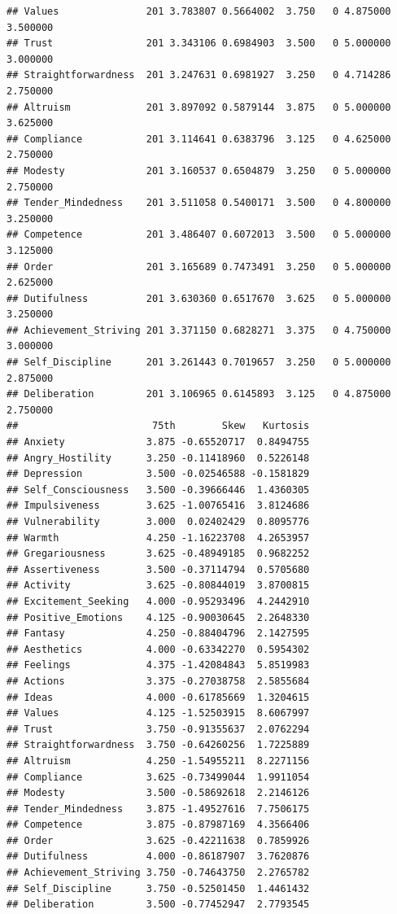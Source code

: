 \documentclass{article}\usepackage[]{graphicx}\usepackage[]{color}
\makeatletter
\newenvironment{kframe}{%
 \def\at@end@of@kframe{}%
 \ifinner\ifhmode%
  \def\at@end@of@kframe{\end{minipage}}%
  \begin{minipage}{\columnwidth}%
 \fi\fi%
 \def\FrameCommand##1{\hskip\@totalleftmargin \hskip-\fboxsep
 \colorbox{shadecolor}{##1}\hskip-\fboxsep
     \hskip-\linewidth \hskip-\@totalleftmargin \hskip\columnwidth}%
 \MakeFramed {\advance\hsize-\width
   \@totalleftmargin\z@ \linewidth\hsize
   \@setminipage}}%
 {\par\unskip\endMakeFramed%
 \at@end@of@kframe}
\newenvironment{knitrout}{}{} %
\makeatother
\begin{document}
\begin{knitrout}
\begin{kframe}
\begin{verbatim}
## Values               201 3.783807 0.5664002  3.750   0 4.875000 3.500000
## Trust                201 3.343106 0.6984903  3.500   0 5.000000 3.000000
## Straightforwardness  201 3.247631 0.6981927  3.250   0 4.714286 2.750000
## Altruism             201 3.897092 0.5879144  3.875   0 5.000000 3.625000
## Compliance           201 3.114641 0.6383796  3.125   0 4.625000 2.750000
## Modesty              201 3.160537 0.6504879  3.250   0 5.000000 2.750000
## Tender_Mindedness    201 3.511058 0.5400171  3.500   0 4.800000 3.250000
## Competence           201 3.486407 0.6072013  3.500   0 5.000000 3.125000
## Order                201 3.165689 0.7473491  3.250   0 5.000000 2.625000
## Dutifulness          201 3.630360 0.6517670  3.625   0 5.000000 3.250000
## Achievement_Striving 201 3.371150 0.6828271  3.375   0 4.750000 3.000000
## Self_Discipline      201 3.261443 0.7019657  3.250   0 5.000000 2.875000
## Deliberation         201 3.106965 0.6145893  3.125   0 4.875000 2.750000
##                       75th        Skew   Kurtosis
## Anxiety              3.875 -0.65520717  0.8494755
## Angry_Hostility      3.250 -0.11418960  0.5226148
## Depression           3.500 -0.02546588 -0.1581829
## Self_Consciousness   3.500 -0.39666446  1.4360305
## Impulsiveness        3.625 -1.00765416  3.8124686
## Vulnerability        3.000  0.02402429  0.8095776
## Warmth               4.250 -1.16223708  4.2653957
## Gregariousness       3.625 -0.48949185  0.9682252
## Assertiveness        3.500 -0.37114794  0.5705680
## Activity             3.625 -0.80844019  3.8700815
## Excitement_Seeking   4.000 -0.95293496  4.2442910
## Positive_Emotions    4.125 -0.90030645  2.2648330
## Fantasy              4.250 -0.88404796  2.1427595
## Aesthetics           4.000 -0.63342270  0.5954302
## Feelings             4.375 -1.42084843  5.8519983
## Actions              3.375 -0.27038758  2.5855684
## Ideas                4.000 -0.61785669  1.3204615
## Values               4.125 -1.52503915  8.6067997
## Trust                3.750 -0.91355637  2.0762294
## Straightforwardness  3.750 -0.64260256  1.7225889
## Altruism             4.250 -1.54955211  8.2271156
## Compliance           3.625 -0.73499044  1.9911054
## Modesty              3.500 -0.58692618  2.2146126
## Tender_Mindedness    3.875 -1.49527616  7.7506175
## Competence           3.875 -0.87987169  4.3566406
## Order                3.625 -0.42211638  0.7859926
## Dutifulness          4.000 -0.86187907  3.7620876
## Achievement_Striving 3.750 -0.74643750  2.2765782
## Self_Discipline      3.750 -0.52501450  1.4461432
## Deliberation         3.500 -0.77452947  2.7793545

\end{verbatim}
\end{kframe}
\end{knitrout}
\end{document}

